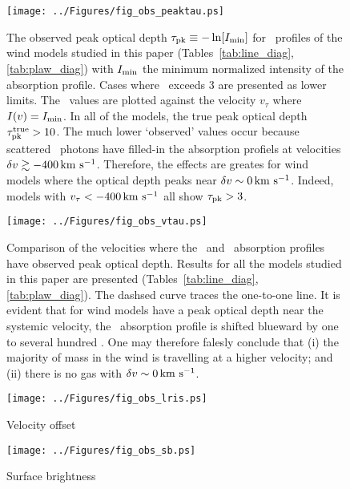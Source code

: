 \documentclass[12pt,preprint]{aastex}
\begin{document}
\begin{figure}
\texttt{[image: ../Figures/fig\_obs\_peaktau.ps]}
\caption{
The observed peak optical depth $\tau_{\rm pk} \equiv -\ln [I_{\rm
  min}]$ for \mgiia\ profiles of the wind models studied in this paper
(Tables~\ref{tab:line_diag}, \ref{tab:plaw_diag}) with $I_{\rm min}$
the minimum normalized intensity of the absorption profile.  Cases
where \tpk\ exceeds 3 are presented as lower limits.  The \tpk\ values
are plotted against the velocity $v_\tau$ where $I(v) = I_{\rm min}$.  In all
of the models, the true peak optical depth $\tau_{\rm pk}^{\rm true} > 10$.
The much lower `observed' values occur because scattered \mgiia\
photons have filled-in the absorption profiels at velocities $\delta v
\gtrsim -400 \, {\rm km~s^{-1}}$.  Therefore, the effects are greates for wind
models where the optical depth peaks near $\delta v \sim 0 \, {\rm km~s^{-1}}$.
Indeed, models with $v_\tau < -400 \, {\rm km~s^{-1}}$ all show $\tau_{\rm pk} > 3$.
}
\label{fig:obs_peaktau}
\end{figure}

\begin{figure}
\texttt{[image: ../Figures/fig\_obs\_vtau.ps]}
\caption{
Comparison of the velocities where the \feiia\ and \mgiia\ absorption
profiles have observed peak optical depth.  Results for all the models
studied in this paper are presented (Tables~\ref{tab:line_diag},
\ref{tab:plaw_diag}).  The dashsed curve traces the one-to-one line.
It is evident that for wind models have a peak optical depth near the
systemic velocity, the \mgiib\ absorption profile is shifted blueward
by one to several hundred \kms.  One may therefore falesly conclude
that (i) the majority of mass in the wind is travelling at a higher
velocity; and (ii) there is no gas with $\delta v \sim 0 \, {\rm km~s^{-1}}$.
}
\label{fig:obs_vtau}
\end{figure}

\begin{figure}
\texttt{[image: ../Figures/fig\_obs\_lris.ps]}
\caption{
Velocity offset
}
\label{fig:obs_lris}
\end{figure}

\begin{figure}
\texttt{[image: ../Figures/fig\_obs\_sb.ps]}
\caption{
Surface brightness
}
\label{fig:obs_sb}
\end{figure}
\end{document}
